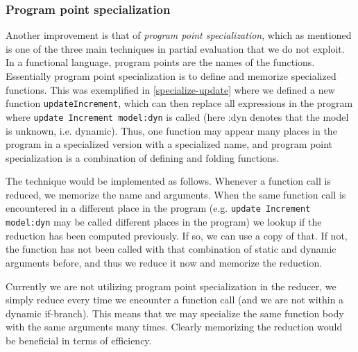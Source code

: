 \subsubsection{Program point specialization}  Another improvement is that of \textit{program point specialization}, which as mentioned is one of the three main techniques in partial evaluation that we do not exploit. In a functional language, program points are the names of the functions. Essentially program point specialization is to define and memorize specialized functions. This was exemplified in \ref{specialize-update} where we defined a new function \texttt{updateIncrement}, which can then replace all expressions in the program where \texttt{update Increment model:dyn} is called (here :dyn denotes that the model is unknown, i.e. dynamic). Thus, one function may appear many places in the program in a specialized version with a specialized name, and program point specialization is a combination of defining and folding functions.

The technique would be implemented as follows. Whenever a function call is reduced, we memorize the name and arguments. When the same function call is encountered in a different place in the program (e.g. \texttt{update Increment model:dyn} may be called different places in the program) we lookup if the reduction has been computed previously. If so, we can use a copy of that. If not, the function has not been called with that combination of static and dynamic arguments before, and thus we reduce it now and memorize the reduction.

Currently we are not utilizing program point specialization in the reducer, we simply reduce every time we encounter a function call (and we are not within a dynamic if-branch). This means that we may specialize the same function body with the same arguments many times. Clearly memorizing the reduction would be beneficial in terms of efficiency. 
